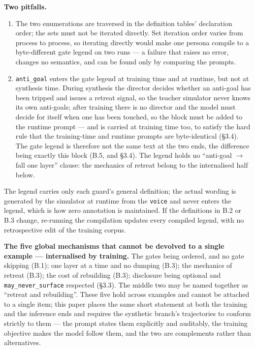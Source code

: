 \documentclass[letterpaper]{article}
\begin{document}
\textbf{Two pitfalls.}

\begin{enumerate}
\item The two enumerations are traversed in the definition tables' declaration order; the sets must not be iterated directly. Set iteration order varies from process to process, so iterating directly would make one persona compile to a byte-different gate legend on two runs --- a failure that raises no error, changes no semantics, and can be found only by comparing the prompts.
\item \texttt{anti\_goal} enters the gate legend at training time and at runtime, but not at synthesis time. During synthesis the director decides whether an anti-goal has been tripped and issues a retreat signal, so the teacher simulator never knows its own anti-goals; after training there is no director and the model must decide for itself when one has been touched, so the block must be added to the runtime prompt --- and is carried at training time too, to satisfy the hard rule that the training-time and runtime prompts are byte-identical (\S{}3.4). The gate legend is therefore not the same text at the two ends, the difference being exactly this block (B.5, and \S{}3.4). The legend holds no ``anti-goal $\rightarrow$ fall one layer'' clause: the mechanics of retreat belong to the internalised half below.
\end{enumerate}

The legend carries only each guard's general definition; the actual wording is generated by the simulator at runtime from the \texttt{voice} and never enters the legend, which is how zero annotation is maintained. If the definitions in B.2 or B.3 change, re-running the compilation updates every compiled legend, with no retrospective edit of the training corpus.

\textbf{The five global mechanisms that cannot be devolved to a single example --- internalised by training.} The gates being ordered, and no gate skipping (B.1); one layer at a time and no dumping (B.3); the mechanics of retreat (B.3); the cost of rebuilding (B.3); disclosure being optional and \texttt{may\_never\_surface} respected (\S{}3.3). The middle two may be named together as ``retreat and rebuilding''. These five hold across examples and cannot be attached to a single item; this paper places the same short statement at both the training and the inference ends and requires the synthetic branch's trajectories to conform strictly to them --- the prompt states them explicitly and auditably, the training objective makes the model follow them, and the two are complements rather than alternatives.
\end{document}
